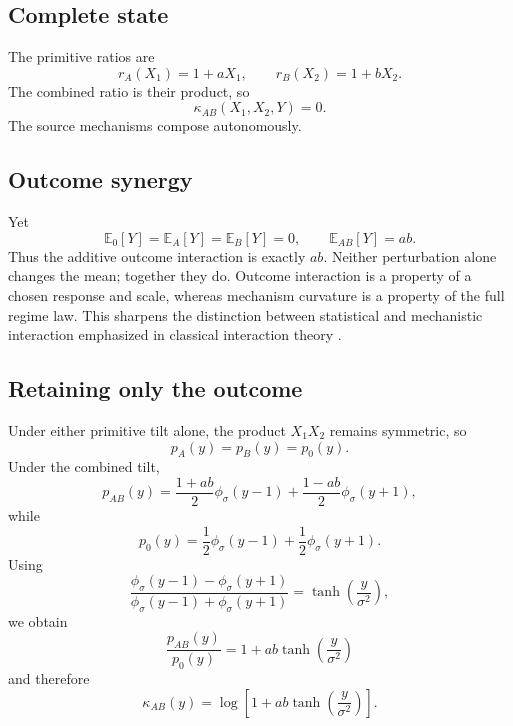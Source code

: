 \documentclass[11pt]{article}
\newcommand{\E}{\mathbb{E}}
\begin{document}
\subsection{Complete state}

The primitive ratios are
\begin{equation}
r_A(X_1)=1+aX_1,
\qquad
r_B(X_2)=1+bX_2.
\end{equation}
The combined ratio is their product, so
\begin{equation}
\kappa_{AB}(X_1,X_2,Y)=0.
\end{equation}
The source mechanisms compose autonomously.

\subsection{Outcome synergy}

Yet
\begin{equation}
\E_0[Y]=\E_A[Y]=\E_B[Y]=0,
\qquad
\E_{AB}[Y]=ab.
\end{equation}
Thus the additive outcome interaction is exactly \(ab\).  Neither perturbation alone changes the mean; together they do.  Outcome interaction is a property of a chosen response and scale, whereas mechanism curvature is a property of the full regime law.  This sharpens the distinction between statistical and mechanistic interaction emphasized in classical interaction theory \citep{vanderweele2014interaction}.

\subsection{Retaining only the outcome}

Under either primitive tilt alone, the product \(X_1X_2\) remains symmetric, so
\begin{equation}
p_A(y)=p_B(y)=p_0(y).
\end{equation}
Under the combined tilt,
\begin{equation}
p_{AB}(y)=
\frac{1+ab}{2}\phi_\sigma(y-1)
+
\frac{1-ab}{2}\phi_\sigma(y+1),
\end{equation}
while
\begin{equation}
p_0(y)=\frac12\phi_\sigma(y-1)+\frac12\phi_\sigma(y+1).
\end{equation}
Using
\begin{equation}
\frac{\phi_\sigma(y-1)-\phi_\sigma(y+1)}
{\phi_\sigma(y-1)+\phi_\sigma(y+1)}
=
\tanh\left(\frac{y}{\sigma^2}\right),
\end{equation}
we obtain
\begin{equation}
\frac{p_{AB}(y)}{p_0(y)}
=
1+ab\tanh\left(\frac{y}{\sigma^2}\right)
\end{equation}
and therefore
\begin{equation}
\boxed{
\kappa_{AB}(y)=
\log\left[1+ab\tanh\left(\frac{y}{\sigma^2}\right)\right].
}
\label{eq:tanh-curvature}
\end{equation}
\end{document}
